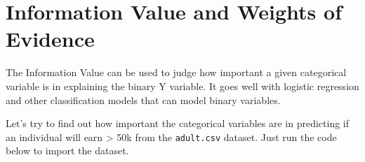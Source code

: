 \documentclass[]{book}
\newenvironment{Shaded}{\begin{snugshade}}{\end{snugshade}}
\newcommand{\CommentTok}[1]{\textcolor[rgb]{0.56,0.35,0.01}{\textit{#1}}}
\newcommand{\KeywordTok}[1]{\textcolor[rgb]{0.13,0.29,0.53}{\textbf{#1}}}
\newcommand{\NormalTok}[1]{#1}
\newcommand{\OperatorTok}[1]{\textcolor[rgb]{0.81,0.36,0.00}{\textbf{#1}}}
\begin{document}
\begin{Shaded}
\end{Shaded}

\hypertarget{information-value-and-weights-of-evidence}{%
\section{Information Value and Weights of Evidence}\label{information-value-and-weights-of-evidence}}

The Information Value can be used to judge how important a given categorical variable is in explaining the binary Y variable. It goes well with logistic regression and other classification models that can model binary variables.

Let's try to find out how important the categorical variables are in predicting if an individual will earn \textgreater{} 50k from the \texttt{adult.csv} dataset. Just run the code below to import the dataset.
\end{document}
